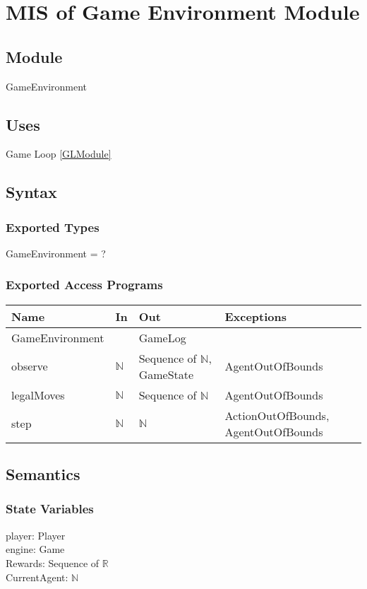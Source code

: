 \documentclass[12pt, titlepage]{article}
\begin{document}
\newpage
\section{MIS of Game Environment Module} \label{GEModule} 
\subsection{Module}
GameEnvironment

\subsection{Uses}
Game Loop \ref{GLModule}

\subsection{Syntax}

\subsubsection{Exported Types}
GameEnvironment = ?

\subsubsection{Exported Access Programs}

\begin{tabular}{p{4cm} p{2cm} p{4cm} p{5cm}}
\hline
\textbf{Name} & \textbf{In} & \textbf{Out} & \textbf{Exceptions} \\
\hline
GameEnvironment &  & GameLog &  \\
observe & $\mathbb{N}$ & Sequence of $\mathbb{N}$, GameState & AgentOutOfBounds \\
legalMoves & $\mathbb{N}$ & Sequence of $\mathbb{N}$ & AgentOutOfBounds\\
step & $\mathbb{N}$ & $\mathbb{N}$ & ActionOutOfBounds, AgentOutOfBounds\\
\hline
\end{tabular}

\subsection{Semantics}

\subsubsection{State Variables}
player: Player \\
engine: Game \\
Rewards: Sequence of $\mathbb{R}$ \\
CurrentAgent: $\mathbb{N}$\\
\end{document}
